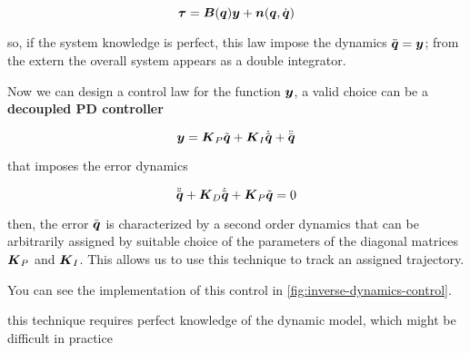 \begin{equation}
    \boldsymbol{\tau} = \boldsymbol{B}(\boldsymbol{q})\boldsymbol{y} + \boldsymbol{n}(\boldsymbol{q},\dot{\boldsymbol{q}})\label{eq:control-law-inverse-dynamics-control-joints-space}
\end{equation}

so, if the system knowledge is perfect, this law impose the dynamics $\ddot{\boldsymbol{q}} = \boldsymbol{y}$;
from the extern the overall system appears as a double integrator.

Now we can design a control law for the function $\boldsymbol{y}$, a valid choice can be a \textbf{decoupled PD controller}

\begin{equation}
    \boldsymbol{y} = \boldsymbol{K}_P \tilde{\boldsymbol{q}} + \boldsymbol{K}_I \dot{\tilde{\boldsymbol{q}}} + \ddot{\bar{\boldsymbol{q}}}\label{eq:inverse-dynamics-control-law}
\end{equation}

that imposes the error dynamics

\[
	\ddot{\tilde{\boldsymbol{q}}} + \boldsymbol{K}_D \dot{\tilde{\boldsymbol{q}}} + \boldsymbol{K}_P \tilde{\boldsymbol{q}} = 0
\]

then, the error $\tilde{\boldsymbol{q}}$ is characterized by a second order dynamics that can be arbitrarily assigned by suitable choice of the parameters of the diagonal matrices $\boldsymbol{K}_P$ and $\boldsymbol{K}_I$.
This allows us to use this technique to track an assigned trajectory.

You can see the implementation of this control in \autoref{fig:inverse-dynamics-control}.

\begin{nb}this technique requires perfect knowledge of the dynamic model, which might be difficult in practice\end{nb}

